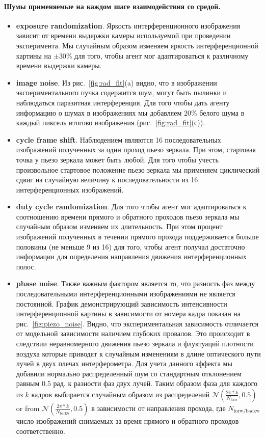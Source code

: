 \paragraph{Шумы применяемые на каждом шаге взаимодействия со средой.}
\begin{itemize}
    \item \textbf{exposure randomization}. Яркость интерференционного изображения зависит от времени выдержки камеры используемой при проведении эксперимента. Мы случайным образом изменяем яркость интерференционной картины на $\pm 30\%$ для того, чтобы агент мог адаптироваться к различному времени выдержки камеры.
    \item  \textbf{image noise}. Из рис.~\ref{fig:rad_fit}(a) видно, что в изображении экспериментального пучка содержится шум, могут быть пылинки и наблюдаться паразитная интерференция. Для того чтобы дать агенту информацию о шумах в изображениях мы добавляем $20\%$ белого шума в каждый пиксель итогово изображения (рис.~\ref{fig:rad_fit}(с)). 
    \item \textbf{cycle frame shift}. Наблюдением являются 16 последовательных изображений полученных за один проход пьезо зеркала. При этом, стартовая точка у пьезо зеркала может быть любой. Для того чтобы учесть произвольное стартовое положение пьезо зеркала мы применяем циклический сдвиг на случайную величину к последовательности из 16 интерференционных изображений. 
    \item \textbf{duty cycle randomization}. Для того чтобы агент мог адаптироваться к соотношению времени прямого и обратного проходов пьезо зеркала мы случайным образом изменяем их длительность. При этом процент изображений полученных в течении прямого прохода поддерживается больше половины (не меньше 9 из 16) для того, чтобы агент получал достаточно информации для определения направления движения интерференционных полос.  
    \item \textbf{phase noise}. Также важным фактором является то, что разность фаз между последовательными интерференционными изображениями не является постоянной. График демонстрирующий зависимость интенсивности интерференционной картины в зависимости от номера кадра показан на рис.~\ref{fig:piezo_noise}. Видно, что экспериментальная зависимость отличается от модельной зависимости наличием глубоких провалов. Это происходит в следствии неравномерного движения пьезо зеркала и флуктуаций плотности воздуха которые приводят к случайным изменениям в длине оптического пути лучей в двух плечах интерферометра. Для учета данного эффекта мы добавили нормально распределенный шум со стандартным отклонением равным $0.5$ рад. к разности фаз двух лучей. Таким образом фаза для каждого из $k$ кадров выбирается случайным образом из распределений $\mathcal{N}(\frac{2\pi * k}{N_{\mathrm{forw}}}, 0.5)$ or from $\mathcal{N}(\frac{2\pi * k}{N_{\mathrm{backw}}}, 0.5)$ в зависимости от направления прохода, где $N_{\mathrm{forw/backw}}$ число изображений снимаемых за время прямого и обратного проходов соответственно.
\end{itemize}

